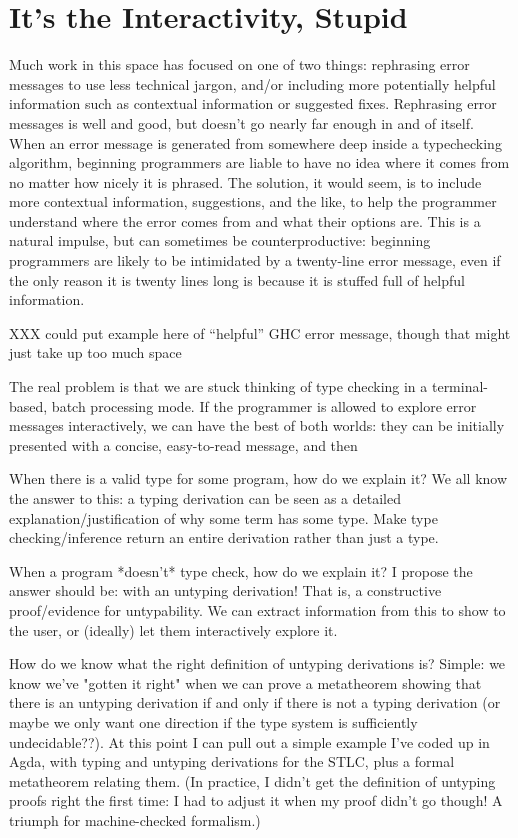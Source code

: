\documentclass[sigplan, screen]{acmart}\settopmatter{printccs=false,printacmref=false}
\begin{document}
\section{It's the Interactivity, Stupid}

Much work in this space has focused on one of two things: rephrasing
error messages to use less technical jargon, and/or including more
potentially helpful information such as contextual information or
suggested fixes.  Rephrasing error messages is well and good, but
doesn't go nearly far enough in and of itself.  When an error message
is generated from somewhere deep inside a typechecking algorithm,
beginning programmers are liable to have no idea where it comes from
no matter how nicely it is phrased.  The solution, it would seem, is
to include more contextual information, suggestions, and the like, to
help the programmer understand where the error comes from and what
their options are.  This is a natural impulse, but can sometimes be
counterproductive: beginning programmers are likely to be intimidated
by a twenty-line error message, even if the only reason it is twenty
lines long is because it is stuffed full of helpful information.

XXX could put example here of ``helpful'' GHC error message, though
that might just take up too much space

The real problem is that we are stuck thinking of type checking in a
terminal-based, batch processing mode.  If the programmer is allowed
to explore error messages interactively, we can have the best of both
worlds: they can be initially presented with a concise, easy-to-read
message, and then 





When there is a valid type for some program, how do we explain it?  We all know the answer to this: a typing derivation can be seen as a detailed explanation/justification of why some term has some type.  Make type checking/inference return an entire derivation rather than just a type.

When a program *doesn't* type check, how do we explain it?  I propose the answer should be: with an untyping derivation!  That is, a constructive proof/evidence for untypability.  We can extract information from this to show to the user, or (ideally) let them interactively explore it.

How do we know what the right definition of untyping derivations is?  Simple: we know we've "gotten it right" when we can prove a metatheorem showing that there is an untyping derivation if and only if there is not a typing derivation (or maybe we only want one direction if the type system is sufficiently undecidable??).  At this point I can pull out a simple example I've coded up in Agda, with typing and untyping derivations for the STLC, plus a formal metatheorem relating them.  (In practice, I didn't get the definition of untyping proofs right the first time: I had to adjust it when my proof didn't go though!  A triumph for machine-checked formalism.)
\end{document}
